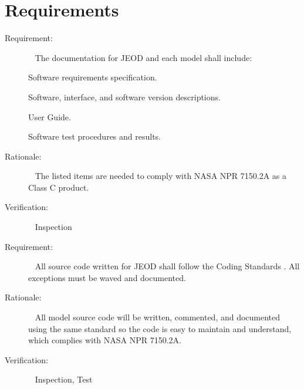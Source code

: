 %
%
%
%
%
%

\chapter{Requirements}\label{sec:reqts}

\label{reqt:documentation}
\begin{description}
  \item[Requirement:]\ \newline
    The documentation for JEOD and each model shall include:

    \subrequirement{}
    \label{reqt:reqts_doc}
      Software requirements specification.

    \subrequirement{}
    \label{reqt:design_doc}
      Software, interface, and software version descriptions.

    \subrequirement{}
    \label{reqt:user_doc}
      User Guide.

    \subrequirement{}
    \label{reqt:test_doc}
      Software test procedures and results.

  \item[Rationale:]\ \newline
    The listed items are needed to comply with NASA NPR 7150.2A as a Class C product.

  \item[Verification:]\ \newline
    Inspection
\end{description}

\label{reqt:jeod_code}
\begin{description}
  \item[Requirement:]\ \newline
    All source code written for JEOD shall follow the Coding Standards \cite{dynenv:CODE_STANDARD}. All exceptions must be waved and documented.

  \item[Rationale:]\ \newline
    All model source code will be written, commented, and documented using the same standard so the code is easy to maintain and understand, which complies with NASA NPR 7150.2A.

  \item[Verification:]\ \newline
    Inspection, Test
\end{description}

